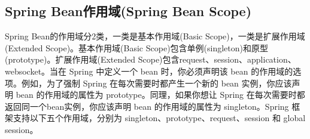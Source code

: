 \documentclass[../../../interview-questions.tex]{subfiles}
\begin{document}
\subsection{Spring Bean作用域(Spring Bean Scope)}

Spring Bean的作用域分2类，一类是基本作用域(Basic Scope)，一类是扩展作用域(Extended Scope)。基本作用域(Basic Scope)包含单例(singleton)和原型(prototype)。扩展作用域(Extended Scope)包含request、session、application、websocket。当在 Spring 中定义一个 bean 时，你必须声明该 bean 的作用域的选项。例如，为了强制 Spring 在每次需要时都产生一个新的 bean 实例，你应该声明 bean 的作用域的属性为 prototype。同理，如果你想让 Spring 在每次需要时都返回同一个bean实例，你应该声明 bean 的作用域的属性为 singleton。Spring 框架支持以下五个作用域，分别为 singleton、prototype、request、session 和 global session。
\end{document}
